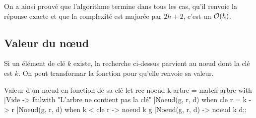  On a ainsi prouvé que l'algorithme termine dans tous les cas, qu'il renvoie la réponse exacte et que la complexité est majorée par $2h+2$, c'est un ${\cal O}(h)$.
\subsection{Valeur du nœud}
Si un élément de clé $k$ existe, la recherche ci-dessus parvient au nœud dont la clé est $k$. On peut transformar la fonction pour qu'elle renvoie sa valeur.
\begin{code}{Valeur d'un nœud en fonction de sa clé}
let rec noeud k arbre = 
  match arbre with
  |Vide -> failwith "L'arbre ne contient pas la clé"
  |Noeud(g, r, d) when cle r = k -> r
  |Noeud(g, r, d) when k < cle r -> noeud k g
  |Noeud(g, r, d) -> noeud k d;;
\end{code}
